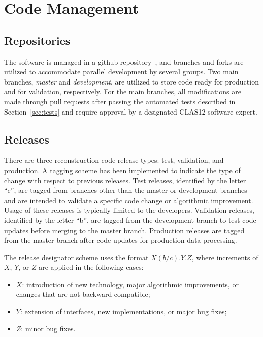 \section{Code Management}
\label{sec:manage}

\subsection{Repositories}

The software is managed in a github repository~\cite{recon-github}, and branches and forks are utilized to
accommodate parallel development by several groups.  Two main branches, {\it master} and {\it development}, are
utilized to store code ready for production and for validation, respectively. For the main branches, all modifications
are made through pull requests after passing the automated tests described in Section~\ref{sec:tests} and require
approval by a designated CLAS12 software expert.

\subsection{Releases}

There are three reconstruction code release types: test, validation, and production. A tagging scheme has been
implemented to indicate the type of change with respect to previous releases. Test releases, identified by the
letter ``c'', are tagged from branches other than the master or development branches and are intended to
validate a specific code change or algorithmic improvement. Usage of these releases is typically limited to the
developers. Validation releases, identified by the letter ``b'', are tagged from the development branch to test
code updates before merging to the master branch. Production releases are tagged from the master branch
after code updates for production data processing.

The release designator scheme uses the format $X(b/c).Y.Z$, where increments of $X$, $Y$, or $Z$ are applied
in the following cases:

\begin{itemize}
  \item $X$: introduction of new technology, major algorithmic improvements, or changes that are not backward
  compatible;
  \item $Y$: extension of interfaces, new implementations, or major bug fixes;
  \item $Z$: minor bug fixes.
\end{itemize}

